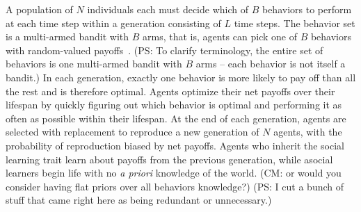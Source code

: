\documentclass[letterpaper,11.5pt]{scrartcl}
\newcommand{\cm}[1]{{\textcolor{mypurple} {({\tiny CM:} #1)}}}
\newcommand{\ps}[1]{{\textcolor{mygreen} {({\tiny PS:} #1)}}}
\begin{document}
A population of $N$ individuals each must decide which of $B$ behaviors to perform at
each time step within a generation consisting of $L$ time steps. The behavior set is a multi-armed bandit with $B$ arms, that is, agents can pick one of $B$ behaviors with random-valued payoffs~\cite{SuttonBartoBook,McElreath2005,Steyvers2009,Rendell2010,Schulz2019}. \ps{To clarify terminology, the entire set of behaviors is one multi-armed bandit with $B$ arms -- each behavior is not itself a bandit.} 
In each generation, exactly one behavior is more likely to pay off than all the rest and is therefore optimal. Agents
optimize their net payoffs over their lifespan by quickly figuring out which
behavior is optimal and performing it as often as possible within their lifespan.
At the end of each
generation, agents are selected with replacement to reproduce a new generation of $N$ agents, with the probability of reproduction biased by net payoffs. Agents who inherit the social learning trait learn about payoffs from the previous generation, while asocial learners begin life with no \emph{a priori}
knowledge of the world. \cm{or would you consider having flat priors over all behaviors knowledge?}  
\ps{I cut a bunch of stuff that came right here as being redundant or unnecessary.}
\end{document}
